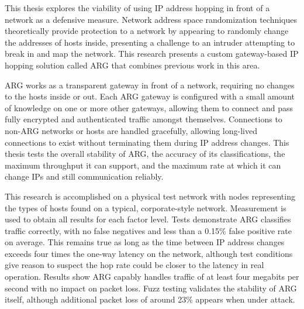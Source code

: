 \par This thesis explores the viability of using \ac{IP} address hopping in front of a network as a defensive measure. Network address space randomization techniques theoretically provide protection to a network by appearing to randomly change the addresses of hosts inside, presenting a challenge to an intruder attempting to break in and map the network. This research presents a custom gateway-based \ac{IP} hopping solution called \ac{ARG} that combines previous work in this area.

\par \ac{ARG} works as a transparent gateway in front of a network, requiring no changes to the hosts inside or out. Each \ac{ARG} gateway is configured with a small amount of knowledge on one or more other gateways, allowing them to connect and pass fully encrypted and authenticated traffic amongst themselves. Connections to non-\ac{ARG} networks or hosts are handled gracefully, allowing long-lived connections to exist without terminating them during \ac{IP} address changes. This thesis tests the overall stability of \ac{ARG}, the accuracy of its classifications, the maximum throughput it can support, and the maximum rate at which it can change \acp{IP} and still communication reliably.

\par This research is accomplished on a physical test network with nodes representing the types of hosts found on a typical, corporate-style network. Measurement is used to obtain all results for each factor level. Tests demonstrate \ac{ARG} classifies traffic correctly, with no false negatives and less than a 0.15\% false positive rate on average. This remains true as long as the time between \ac{IP} address changes exceeds four times the one-way latency on the network, although test conditions give reason to suspect the hop rate could be closer to the latency in real operation. Results show \ac{ARG} capably handles traffic of at least four megabits per second with no impact on packet loss. Fuzz testing validates the stability of \ac{ARG} itself, although additional packet loss of around 23\% appears when under attack.

\acresetall


